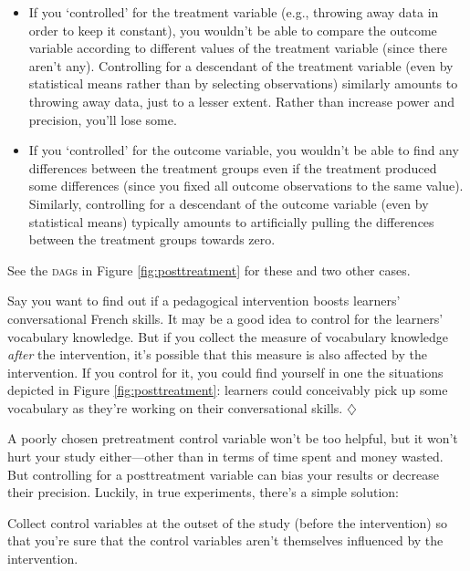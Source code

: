 \documentclass[a4paper]{tufte-book}\usepackage[]{graphicx}\usepackage[]{xcolor}
\newcommand*{\parend}[1][$\diamondsuit$]{%
\leavevmode\unskip\penalty9999 \hbox{}\nobreak\hfill
    \quad\hbox{#1}%
}
\begin{document}
\begin{itemize}
  \item If you `controlled' for the treatment variable
  (e.g., throwing away data in order to keep it constant), you wouldn't be able to compare the outcome variable
  according to different values of the treatment variable (since there aren't any).
  Controlling for a descendant of the treatment variable (even by statistical means
  rather than by selecting observations) similarly amounts to throwing away
  data, just to a lesser extent. Rather than increase power and precision,
  you'll lose some.

  \item If you `controlled' for the outcome variable,
  you wouldn't be able to find any differences between the treatment groups
  even if the treatment produced some differences
  (since you fixed all outcome observations to the same value).
  Similarly, controlling for a descendant of the outcome variable
  (even by statistical means) typically amounts to artificially pulling the
  differences between the treatment groups towards zero.
\end{itemize}

\medskip

See the \textsc{dag}s in Figure \ref{fig:posttreatment} for these and two other
cases.

Say you want to find out if a pedagogical intervention boosts
learners' conversational French skills. It may be a good idea to control
for the learners' vocabulary knowledge. But if you collect the measure of
vocabulary knowledge \emph{after} the intervention, it's possible that
this measure is also affected by the intervention. If you control for it,
you could find yourself in one the situations depicted in Figure \ref{fig:posttreatment}:
learners could conceivably pick up some vocabulary as they're working
on their conversational skills.
\parend

\medskip

A poorly chosen pretreatment control variable won't be too helpful, 
but it won't hurt your study either---other than in terms of time spent and
money wasted.
But controlling for a posttreatment variable can bias your results or decrease their precision.
Luckily, in true experiments, there's a simple solution:

\begin{framed}
 Collect control variables at the outset of the study (before the intervention)
 so that you're sure that the control variables aren't themselves influenced by the intervention.
\end{framed}
\end{document}
